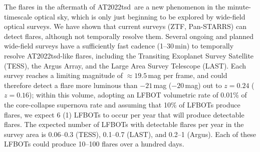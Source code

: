 \documentclass{nature_plusfigure}
\newcommand{\at}{AT2022tsd}
\begin{document}
The flares in the aftermath of \at\ are a new phenomenon in the minute-timescale optical sky, which is only just beginning to be explored by wide-field optical surveys\cite{Andreoni2020,Richmond2020,Corbett2023,Ofek2023}.
We have shown that current surveys (ZTF, Pan-STARRS) can detect flares, although not temporally resolve them. Several ongoing and planned wide-field surveys have a sufficiently fast cadence (1--30\,min) to temporally resolve \at-like flares, including the Transiting Exoplanet Survey Satellite (TESS\cite{Ricker2015}), the Argus Array\cite{Law2022}, and the Large Area Survey Telescope (LAST\cite{Ofek2023}). Each survey reaches a limiting magnitude of $\approx19.5$\,mag per frame, and could therefore detect a flare more luminous than $-21$\,mag ($-20$\,mag) out to $z=0.24$ ($z=0.16$);
within this volume, adopting an LFBOT volumetric rate of 0.01\% of the core-collapse supernova rate\cite{Ho2022_RET} and assuming that 10\% of LFBOTs produce flares, we expect 6 (1) LFBOTs to occur per year that will produce detectable flares. The expected number of LFBOTs with detectable flares per year in the survey area is 0.06--0.3 (TESS), 0.1--0.7 (LAST), and 0.2--1 (Argus). Each of these LFBOTs could produce 10--100 flares over a hundred days.

\newpage
\end{document}
